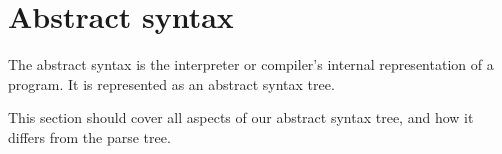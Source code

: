 \section{Abstract syntax}

The abstract syntax is the interpreter or compiler's internal representation of a program. It is represented
as an abstract syntax tree.

This section should cover all aspects of our abstract syntax tree, and how it differs from the
parse tree.

